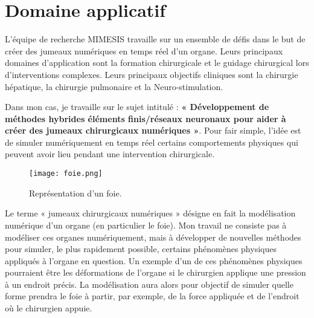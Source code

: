 \section{Domaine applicatif} \label{intro_appli}
\graphicspath{{introduction/images/1_application}}

L'équipe de recherche MIMESIS travaille sur un ensemble de défis dans le but de créer des jumeaux numériques en temps réel d'un organe. Leurs principaux domaines d'application sont la formation chirurgicale et le guidage chirurgical lors d'interventions complexes. Leurs principaux objectifs cliniques sont la chirurgie hépatique, la chirurgie pulmonaire et la Neuro-stimulation. 

Dans mon cas, je travaille sur le sujet intitulé : \textbf{« Développement de méthodes hybrides éléments finis/réseaux neuronaux pour aider à créer des jumeaux chirurgicaux numériques »}. Pour fair simple, l'idée est de simuler numériquement en temps réel certains comportements physiques qui peuvent avoir lieu pendant une intervention chirurgicale. 

\begin{minipage}{0.38\linewidth}
	\begin{figure}[H]
		\centering
		\texttt{[image: foie.png]}
		\caption{Représentation d'un foie.}
	\end{figure}
\end{minipage}
\begin{minipage}{0.58\linewidth}
	Le terme « jumeaux chirurgicaux numériques » désigne en fait la modélisation numérique d’un organe (en particulier le foie). Mon travail ne consiste pas à modéliser ces organes numériquement, mais à développer de nouvelles méthodes pour simuler, le plus rapidement possible, certains phénomènes physiques appliqués à l’organe en question. Un exemple d'un de ces phénomènes physiques pourraient être les déformations de l’organe si le chirurgien applique une pression à un endroit précis. La modélisation aura alors pour objectif de simuler quelle forme prendra le foie à partir, par exemple, de la force appliquée et de l’endroit où le chirurgien appuie. 	
\end{minipage}

